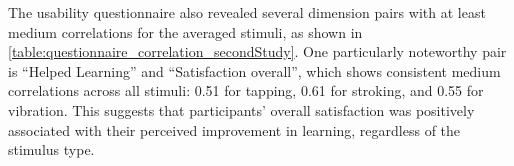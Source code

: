 \begin{table}[ht]
\caption{Correlation within the Usability questionnaire dimensions.}
\label{table:questionnaire_correlation_secondStudy}
\end{table}
The usability questionnaire also revealed several dimension pairs with at least medium correlations for the averaged stimuli, as shown in \autoref{table:questionnaire_correlation_secondStudy}.
One particularly noteworthy pair is \enquote{Helped Learning} and \enquote{Satisfaction overall}, which shows consistent medium correlations across all stimuli: 0.51 for tapping, 0.61 for stroking, and 0.55 for vibration.
This suggests that participants' overall satisfaction was positively associated with their perceived improvement in learning, regardless of the stimulus type.



